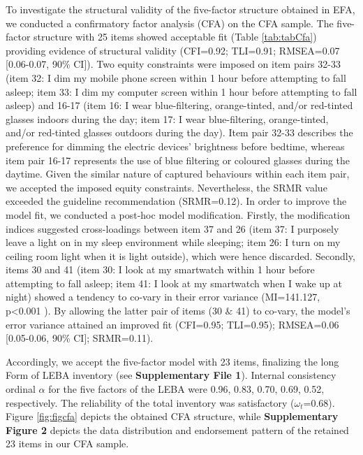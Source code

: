 \documentclass[
  man]{apa6}
\begin{document}
To investigate the structural validity of the five-factor structure obtained in EFA, we conducted a confirmatory factor analysis (CFA) on the CFA sample. The five-factor structure with 25 items showed acceptable fit (Table \ref{tab:tabCfa}) providing evidence of structural validity (CFI=0.92; TLI=0.91; RMSEA=0.07 {[}0.06-0.07, 90\% CI{]}). Two equity constraints were imposed on item pairs 32-33 (item 32: I dim my mobile phone screen within 1 hour before attempting to fall asleep; item 33: I dim my computer screen within 1 hour before attempting to fall asleep) and 16-17 (item 16: I wear blue-filtering, orange-tinted, and/or red-tinted glasses indoors during the day; item 17: I wear blue-filtering, orange-tinted, and/or red-tinted glasses outdoors during the day). Item pair 32-33 describes the preference for dimming the electric devices' brightness before bedtime, whereas item pair 16-17 represents the use of blue filtering or coloured glasses during the daytime. Given the similar nature of captured behaviours within each item pair, we accepted the imposed equity constraints. Nevertheless, the SRMR value exceeded the guideline recommendation (SRMR=0.12). In order to improve the model fit, we conducted a post-hoc model modification. Firstly, the modification indices suggested cross-loadings between item 37 and 26 (item 37: I purposely leave a light on in my sleep environment while sleeping; item 26: I turn on my ceiling room light when it is light outside), which were hence discarded. Secondly, items 30 and 41 (item 30: I look at my smartwatch within 1 hour before attempting to fall asleep; item 41: I look at my smartwatch when I wake up at night) showed a tendency to co-vary in their error variance (MI=141.127, p\textless0.001 ). By allowing the latter pair of items (30 \(\&\) 41) to co-vary, the model's error variance attained an improved fit (CFI=0.95; TLI=0.95); RMSEA=0.06 {[}0.05-0.06, 90\% CI{]}; SRMR=0.11).

Accordingly, we accept the five-factor model with 23 items, finalizing the long Form of LEBA inventory (see \textbf{Supplementary File 1}). Internal consistency ordinal \(\alpha\) for the five factors of the LEBA were 0.96, 0.83, 0.70, 0.69, 0.52, respectively. The reliability of the total inventory was satisfactory (\(\omega_t\)=0.68). Figure \ref{fig:figcfa} depicts the obtained CFA structure, while \textbf{Supplementary Figure 2} depicts the data distribution and endorsement pattern of the retained 23 items in our CFA sample.
\end{document}
